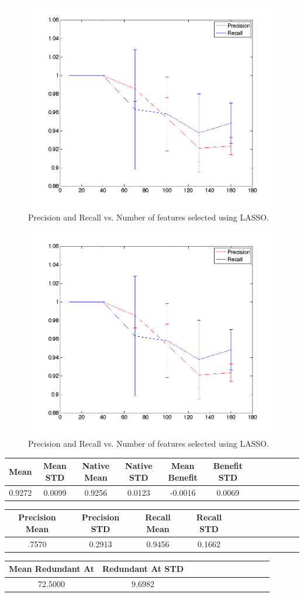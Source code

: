 \begin{center}
\begin{figure}[!ht]
\centering
\includegraphics[width=.7\textwidth]{../images/precisionrecallExpansion.png}
\caption{Precision and Recall vs. Number of features selected using LASSO.}
\label{fig:prec recall}
\end{figure}
\end{center}

\begin{center}
\begin{figure}[!ht]
\centering
\includegraphics[width=.7\textwidth]{../images/precisionrecallExpansion.png}
\caption{Precision and Recall vs. Number of features selected using LASSO.}
\label{fig:prec recall}
\end{figure}
\end{center}

\begin{tabular}{cccccccccccc}
\hline
Mean&Mean STD&Native Mean&Native STD&Mean Benefit&Benefit STD
\\
\hline
0.9272&0.0099&0.9256&0.0123&-0.0016&0.0069
\end{tabular}


\begin{tabular}{cccccccccccc}
\hline
Precision Mean&Precision STD&Recall Mean&Recall STD
\\
\hline
.7570&0.2913&0.9456&0.1662
\end{tabular}


\begin{tabular}{cccccccccccc}
\hline
Mean Redundant At&Redundant At STD\\
\hline
72.5000&9.6982
\end{tabular}
